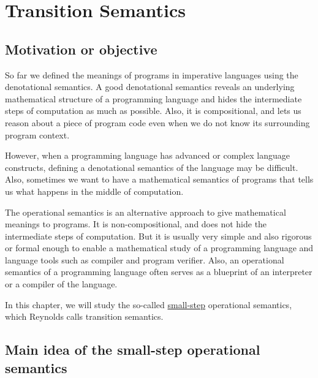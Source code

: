 \chapter{Transition Semantics} \label{ch:transition}

\section{Motivation or objective}

\begin{enumcirc}
	\item
	So far we defined the meanings of programs in imperative languages using the
	denotational semantics.
	A good denotational semantics reveals an underlying mathematical structure of a
	programming language and hides the intermediate steps of computation as much as
	possible.
	Also, it is compositional, and lets us reason about a piece of program code
	even when we do not know its surrounding program context.
	\item
	However, when a programming language has advanced or complex language
	constructs, defining a denotational semantics of the language may be difficult.
	Also, sometimes we want to have a mathematical semantics of programs that tells
	us what happens in the middle of computation.
	\item
	The operational semantics is an alternative approach to give mathematical
	meanings to programs.
	It is non-compositional, and does not hide the intermediate steps of
	computation.
	But it is usually very simple and also rigorous or formal enough to enable a
	mathematical study of a programming language and language tools such as
	compiler and program verifier.
	Also, an operational semantics of a programming language often serves as a
	blueprint of an interpreter or a compiler of the language.
	\item
	In this chapter, we will study the so-called \ul{small-step} operational
	semantics, which Reynolds calls transition semantics.
\end{enumcirc}

\section{Main idea of the small-step operational semantics}

